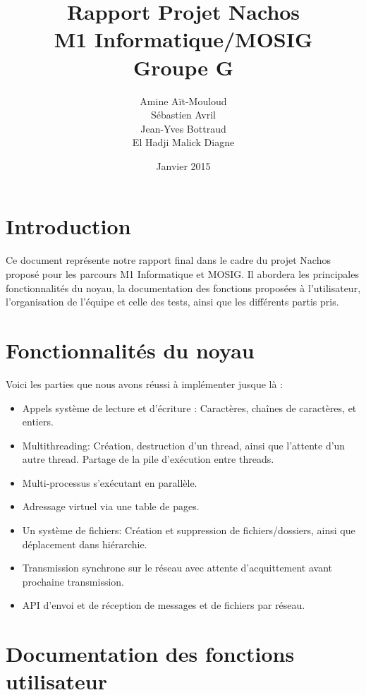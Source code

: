 \documentclass{article}
\title {\vspace*{\fill}Rapport Projet Nachos \\ M1 Informatique/MOSIG \\ Groupe G}
\author{Amine Aït-Mouloud\\ Sébastien Avril\\ Jean-Yves Bottraud\\ El Hadji Malick Diagne}
\date{Janvier 2015\vspace*{\fill}}
\begin{document}
\maketitle

\newpage
\tableofcontents
\newpage
\section{Introduction}
	Ce document représente notre rapport final dans le cadre du projet Nachos proposé pour les parcours M1 Informatique et MOSIG.
	Il abordera les principales fonctionnalités du noyau, la documentation des fonctions proposées à l'utilisateur, l'organisation de l'équipe et celle des tests, ainsi que les différents partis pris.

\section{Fonctionnalités du noyau}
	Voici les parties que nous avons réussi à implémenter jusque là :
	\begin{itemize}
		\item Appels système de lecture et d'écriture : Caractères, chaînes de caractères, et entiers.
		\item Multithreading: Création, destruction d'un thread, ainsi que l'attente d'un autre thread. Partage de la pile d'exécution entre threads.
		\item Multi-processus s'exécutant en parallèle. 
		\item Adressage virtuel via une table de pages.
		\item Un système de fichiers: Création et suppression de fichiers/dossiers, ainsi que déplacement dans hiérarchie.
		\item Transmission synchrone sur le réseau avec attente d'acquittement avant prochaine transmission.
		\item API d'envoi et de réception de messages et de fichiers par réseau. 
	\end{itemize}

\section{Documentation des fonctions utilisateur}
\end{document}
